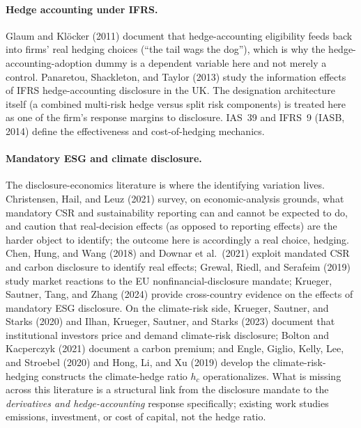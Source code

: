 \documentclass[11pt,a4paper]{article}
\begin{document}
\paragraph{Hedge accounting under IFRS.} Glaum and Kl\"ocker (2011) document that hedge-accounting eligibility feeds back into firms' real hedging choices (``the tail wags the dog''), which is why the hedge-accounting-adoption dummy is a dependent variable here and not merely a control. Panaretou, Shackleton, and Taylor (2013) study the information effects of IFRS hedge-accounting disclosure in the UK. The designation architecture itself (a combined multi-risk hedge versus split risk components) is treated here as one of the firm's response margins to disclosure. IAS~39 and IFRS~9 (IASB, 2014) define the effectiveness and cost-of-hedging mechanics.

\paragraph{Mandatory ESG and climate disclosure.} The disclosure-economics literature is where the identifying variation lives. Christensen, Hail, and Leuz (2021) survey, on economic-analysis grounds, what mandatory CSR and sustainability reporting can and cannot be expected to do, and caution that real-decision effects (as opposed to reporting effects) are the harder object to identify; the outcome here is accordingly a real choice, hedging. Chen, Hung, and Wang (2018) and Downar et al.\ (2021) exploit mandated CSR and carbon disclosure to identify real effects; Grewal, Riedl, and Serafeim (2019) study market reactions to the EU nonfinancial-disclosure mandate; Krueger, Sautner, Tang, and Zhang (2024) provide cross-country evidence on the effects of mandatory ESG disclosure. On the climate-risk side, Krueger, Sautner, and Starks (2020) and Ilhan, Krueger, Sautner, and Starks (2023) document that institutional investors price and demand climate-risk disclosure; Bolton and Kacperczyk (2021) document a carbon premium; and Engle, Giglio, Kelly, Lee, and Stroebel (2020) and Hong, Li, and Xu (2019) develop the climate-risk-hedging constructs the climate-hedge ratio $h_c$ operationalizes. What is missing across this literature is a structural link from the disclosure mandate to the \emph{derivatives and hedge-accounting} response specifically; existing work studies emissions, investment, or cost of capital, not the hedge ratio.
\end{document}
